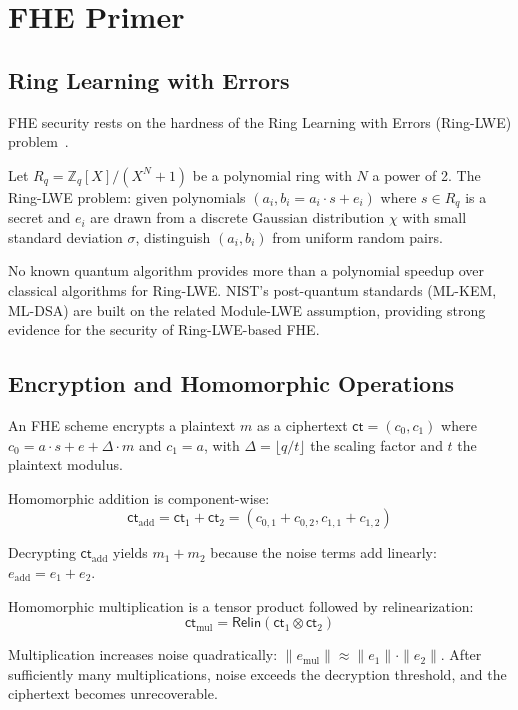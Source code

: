 \section{FHE Primer}

\label{sec:fhe-primer}

\subsection{Ring Learning with Errors}

FHE security rests on the hardness of the Ring Learning with Errors
(Ring-LWE) problem~\cite{lyubashevsky2010ideal}.

\begin{definition}
Let $R_q = \mathbb{Z}_q[X]/(X^N + 1)$ be a polynomial ring with $N$ a power of 2.
The Ring-LWE problem: given polynomials $(a_i, b_i = a_i \cdot s + e_i)$ where
$s \in R_q$ is a secret and $e_i$ are drawn from a discrete Gaussian distribution
$\chi$ with small standard deviation $\sigma$, distinguish $(a_i, b_i)$ from uniform
random pairs.
\end{definition}

No known quantum algorithm provides more than a polynomial speedup over classical
algorithms for Ring-LWE. NIST's post-quantum standards (ML-KEM, ML-DSA) are built
on the related Module-LWE assumption, providing strong evidence for the security of
Ring-LWE-based FHE.

\subsection{Encryption and Homomorphic Operations}

An FHE scheme encrypts a plaintext $m$ as a ciphertext $\textsf{ct} = (c_0, c_1)$
where $c_0 = a \cdot s + e + \Delta \cdot m$ and $c_1 = a$, with $\Delta = \lfloor
q/t \rfloor$ the scaling factor and $t$ the plaintext modulus.

Homomorphic addition is component-wise:
\[
  \textsf{ct}_{\text{add}} = \textsf{ct}_1 + \textsf{ct}_2 = (c_{0,1} + c_{0,2}, c_{1,1} + c_{1,2})
\]

Decrypting $\textsf{ct}_{\text{add}}$ yields $m_1 + m_2$ because the noise terms
add linearly: $e_{\text{add}} = e_1 + e_2$.

Homomorphic multiplication is a tensor product followed by relinearization:
\[
  \textsf{ct}_{\text{mul}} = \textsf{Relin}(\textsf{ct}_1 \otimes \textsf{ct}_2)
\]

Multiplication increases noise quadratically: $\|e_{\text{mul}}\| \approx \|e_1\|
\cdot \|e_2\|$. After sufficiently many multiplications, noise exceeds the decryption
threshold, and the ciphertext becomes unrecoverable.

